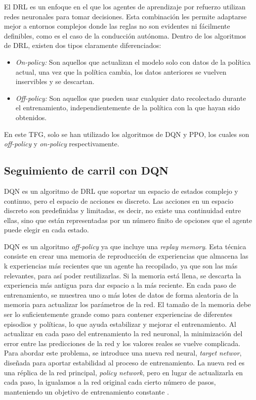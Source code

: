 El \ac{DRL} es un enfoque en el que los agentes de aprendizaje por refuerzo utilizan redes neuronales para tomar decisiones. Esta combinación les permite adaptarse mejor a entornos complejos donde las reglas no son evidentes ni fácilmente definibles, como es el caso de la conducción autónoma. Dentro de los algoritmos de \ac{DRL}, existen dos tipos claramente diferenciados:

\begin{itemize}
		\item \textit{On-policy:} Son aquellos que actualizan el modelo solo con datos de la política actual, una vez que la política cambia, los datos anteriores se vuelven inservibles y se descartan.
		\item \textit{Off-policy:} Son aquellos que pueden usar cualquier dato recolectado durante el entrenamiento, independientemente de la política con la que hayan sido obtenidos.

\end{itemize}

En este \ac{TFG}, solo se han utilizado los algoritmos de \ac{DQN} y \ac{PPO}, los cuales son \textit{off-policy} y \textit{on-policy} respectivamente\cite{drl}.

\subsection{Seguimiento de carril con \ac{DQN}}

\ac{DQN} es un algoritmo de \ac{DRL} que soportar un espacio de estados complejo y continuo, pero el espacio de acciones es discreto. Las acciones en un espacio discreto son predefinidas y limitadas, es decir, no existe una continuidad entre ellas, sino que están representadas por un número finito de opciones que el agente puede elegir en cada estado.

\ac{DQN} es un algoritmo \textit{off-policy} ya que incluye una \textit{replay memory}. Esta técnica consiste en crear una memoria de reproducción de experiencias que almacena las k experiencias más recientes que un agente ha recopilado, ya que son las más relevantes, para así poder reutilizarlas. Si la memoria está llena, se descarta la experiencia más antigua para dar espacio a la más reciente. En cada paso de entrenamiento, se muestrea uno o más lotes de datos de forma aleatoria de la memoria para actualizar los parámetros de la red. El tamaño de la memoria debe ser lo suficientemente grande como para contener experiencias de diferentes episodios y políticas, lo que ayuda estabilizar y mejorar el entrenamiento. Al actualizar en cada paso del entrenamiento la red neuronal, la minimización del error entre las predicciones de la red y los valores reales se vuelve complicada. Para abordar este problema, se introduce una nueva red neural, \textit{target networ}, diseñada para aportar estabilidad al proceso de entrenamiento. La nueva red es una réplica de la red principal, \textit{policy network}, pero en lugar de actualizarla en cada paso, la igualamos a la red original cada cierto número de pasos, manteniendo un objetivo de entrenamiento constante \cite{drl}.

